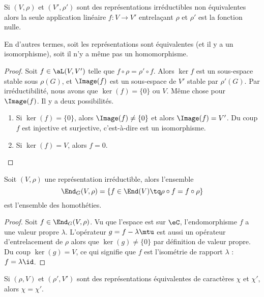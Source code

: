 \begin{theorem}    \label{ThoyftobH}
    Si \( (V,\rho)\) et \( (V',\rho')\) sont des représentations irréductibles non équivalentes alors la seule application linéaire \( f\colon V\to V'\) entrelaçant \( \rho\) et \( \rho'\) est la fonction nulle.

    En d'autres termes, soit les représentations sont équivalentes (et il y a un isomorphisme), soit il n'y a même pas un homomorphisme.
\end{theorem}

\begin{proof}
    Soit \( f\in\aL(V,V')\) telle que \( f\circ \rho=\rho'\circ f\). Alors \( \ker f\) est un sous-espace stable sous \( \rho(G)\), et \( \Image(f)\) est un sous-espace de \( V'\) stable par \( \rho'(G)\). Par irréductibilité, nous avons que \( \ker(f)=\{ 0 \}\) ou \( V\). Même chose pour \( \Image(f)\). Il y a deux possibilités.
    \begin{enumerate}
        \item
            Si \( \ker(f)=\{ 0 \}\), alors \( \Image(f)\neq \{ 0 \}\) et alors \( \Image(f)=V'\). Du coup \( f\) est injective et surjective, c'est-à-dire est un isomorphisme.
        \item
            Si \( \ker(f)=V\), alors \( f=0\).
    \end{enumerate}
\end{proof}

\begin{corollary}
    Soit \( (V,\rho)\) une représentation irréductible, alors l'ensemble
    \begin{equation}
        \End_{G}(V,\rho)=\{ f\in\End(V)\tq \rho\circ f=f\circ \rho \}
    \end{equation}
    est l'ensemble des homothéties.
\end{corollary}

\begin{proof}
    Soit \( f\in\End_{G}(V,\rho)\). Vu que l'espace est sur \( \eC\), l'endomorphisme \( f\) a une valeur propre \( \lambda\). L'opérateur \( g=f-\lambda\mtu\) est aussi un opérateur d'entrelacement de \( \rho\) alors que \( \ker(g)\neq \{ 0 \}\) par définition de valeur propre. Du coup \( \ker(g)=V\), ce qui signifie que \( f\) est l'isométrie de rapport \( \lambda\) : \( f=\lambda\id\).
\end{proof}

\begin{lemma}   \label{LempUSOlo}
    Si \( (\rho,V)\) et \( (\rho',V')\) sont des représentations équivalentes de caractères \( \chi\) et \( \chi'\), alors \( \chi=\chi'\).
\end{lemma}

